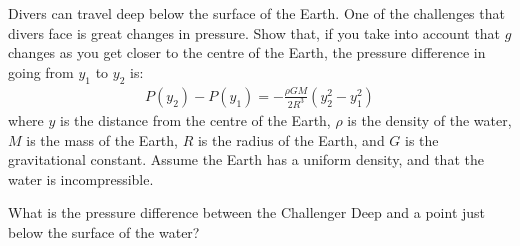 \question  Divers can travel deep below the surface of the Earth. One of the challenges that divers face is great changes in pressure. Show that, if you take into account that $g$ changes as you get closer to the centre of the Earth, the pressure difference in going from $y_1$ to $y_2$ is:
\begin{align*}
P(y_2)-P(y_1)=-\frac{\rho GM}{2R^3}(y_2^2-y_1^2)
\end{align*}
where $y$ is the distance from the centre of the Earth, $\rho$ is the density of the water, $M$ is the mass of the Earth, $R$ is the radius of the Earth, and $G$ is the gravitational constant. 
Assume the Earth has a uniform density, and that the water is incompressible. 
\item What is the pressure difference between the Challenger Deep and a point just below the surface of the water?
